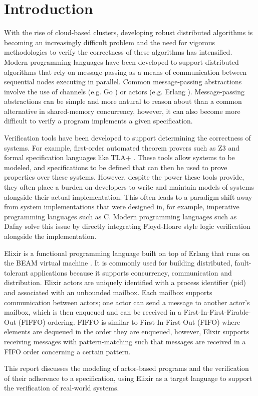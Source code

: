 \chapter{Introduction}
With the rise of cloud-based clusters, developing robust distributed algorithms is becoming an increasingly difficult problem and the need for vigorous methodologies to verify the correctness of these algorithms has intensified. Modern programming languages have been developed to support distributed algorithms that rely on message-passing as a means of communication between sequential nodes executing in parallel. Common message-passing abstractions involve the use of channels (e.g. Go \cite{go}) or actors \cite{actor} (e.g. Erlang \cite{erlang}). Message-passing abstractions can be simple and more natural to reason about than a common alternative in shared-memory concurrency, however, it can also become more difficult to verify a program implements a given specification.
\par
Verification tools have been developed to support determining the correctness of systems. For example, first-order automated theorem provers such as Z3 \cite{z3} and formal specification languages like TLA+ \cite{tlaplus}. These tools allow systems to be modeled, and specifications to be defined that can then be used to prove properties over these systems. However, despite the power these tools provide, they often place a burden on developers to write and maintain models of systems alongside their actual implementation. This often leads to a paradigm shift away from system implementations that were designed in, for example, imperative programming languages such as C. Modern programming languages such as Dafny \cite{dafny} solve this issue by directly integrating Floyd-Hoare style logic verification alongside the implementation.
\par
Elixir \cite{elixir} is a functional programming language built on top of Erlang that runs on the BEAM virtual machine \cite{beam}. It is commonly used for building distributed, fault-tolerant applications because it supports concurrency, communication and distribution. Elixir actors are uniquely identified with a process identifier (pid) and associated with an unbounded mailbox. Each mailbox supports communication between actors; one actor can send a message to another actor's mailbox, which is then enqueued and can be received in a First-In-First-Firable-Out (FIFFO) ordering. FIFFO is similar to First-In-First-Out (FIFO) where elements are dequeued in the order they are enqueued, however, Elixir supports receiving messages with pattern-matching such that messages are received in a FIFO order concerning a certain pattern.
\par
This report discusses the modeling of actor-based programs and the verification of their adherence to a specification, using Elixir as a target language to support the verification of real-world systems.
